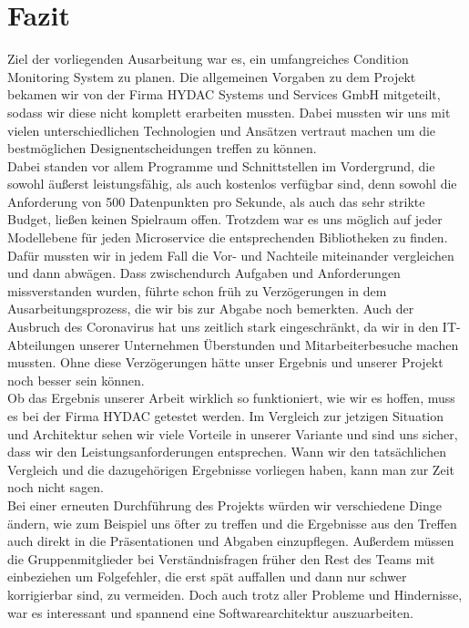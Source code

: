 \chapter{Fazit}
\label{ch:Fazit}
Ziel der vorliegenden Ausarbeitung war es, ein umfangreiches Condition Monitoring System zu planen. Die allgemeinen Vorgaben zu dem Projekt bekamen wir von der Firma HYDAC Systems und Services GmbH mitgeteilt, sodass wir diese nicht komplett erarbeiten mussten. Dabei mussten wir uns mit vielen unterschiedlichen Technologien und Ansätzen vertraut machen um die bestmöglichen Designentscheidungen treffen zu können.\\
Dabei standen vor allem Programme und Schnittstellen im Vordergrund, die sowohl äußerst leistungsfähig, als auch kostenlos verfügbar sind, denn sowohl die Anforderung von 500 Datenpunkten pro Sekunde, als auch das sehr strikte Budget, ließen keinen Spielraum offen. Trotzdem war es uns möglich auf jeder Modellebene für jeden Microservice die entsprechenden Bibliotheken zu finden. Dafür mussten wir in jedem Fall die Vor- und Nachteile miteinander vergleichen und dann abwägen. Dass zwischendurch Aufgaben und Anforderungen missverstanden wurden, führte schon früh zu Verzögerungen in dem Ausarbeitungsprozess, die wir bis zur Abgabe noch bemerkten. Auch der Ausbruch des Coronavirus hat uns zeitlich stark eingeschränkt, da wir in den IT-Abteilungen unserer Unternehmen Überstunden und Mitarbeiterbesuche machen mussten. Ohne diese Verzögerungen hätte unser Ergebnis und unserer Projekt noch besser sein können.\\
Ob das Ergebnis unserer Arbeit wirklich so funktioniert, wie wir es hoffen, muss es bei der Firma HYDAC getestet werden. Im Vergleich zur jetzigen Situation und Architektur sehen wir viele Vorteile in unserer Variante und sind uns sicher, dass wir den Leistungsanforderungen entsprechen. Wann wir den tatsächlichen Vergleich und die dazugehörigen Ergebnisse vorliegen haben, kann man zur Zeit noch nicht sagen.\\
Bei einer erneuten Durchführung des Projekts würden wir verschiedene Dinge ändern, wie zum Beispiel uns öfter zu treffen und die Ergebnisse aus den Treffen auch direkt in die Präsentationen und Abgaben einzupflegen. Außerdem müssen die Gruppenmitglieder bei Verständnisfragen früher den Rest des Teams mit einbeziehen um Folgefehler, die erst spät auffallen und dann nur schwer korrigierbar sind, zu vermeiden. Doch auch trotz aller Probleme und Hindernisse, war es interessant und spannend eine Softwarearchitektur auszuarbeiten.


